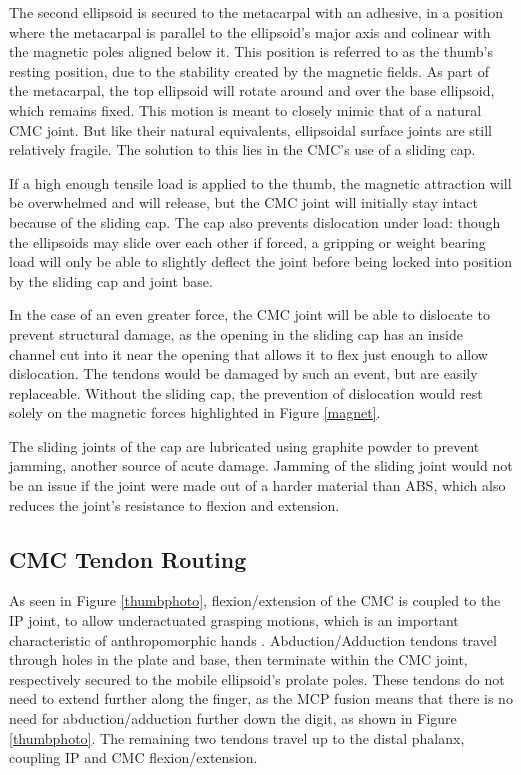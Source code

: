\documentclass[letterpaper, 10 pt, conference]{ieeeconf}  %
\newcommand{\rFig}[1]{Figure \ref{#1}}
\begin{document}
The second ellipsoid is secured to the metacarpal with an adhesive, in a position where the metacarpal is parallel to the ellipsoid's major axis and colinear with the magnetic poles aligned below it. This position is referred to as the thumb's resting position, due to the stability created by the magnetic fields. As part of the metacarpal, the top ellipsoid will rotate around and over the base ellipsoid, which remains fixed. This motion is meant to closely mimic that of a natural CMC joint. But like their natural equivalents, ellipsoidal surface joints are still relatively fragile. The solution to this lies in the CMC's use of a sliding cap.

If a high enough tensile load is applied to the thumb, the magnetic attraction will be overwhelmed and will release, but the CMC joint will initially stay intact because of the sliding cap. The cap also prevents dislocation under load: though the ellipsoids may slide over each other if forced, a gripping or weight bearing load will only be able to slightly deflect the joint before being locked into position by the sliding cap and joint base.

 In the case of an even greater force, the CMC joint will be able to dislocate to prevent structural damage, as the opening in the sliding cap has an inside channel cut into it near the opening that allows it to flex just enough to allow dislocation. The tendons would be damaged by such an event, but are easily replaceable. Without the sliding cap, the prevention of dislocation would rest solely on the magnetic forces highlighted in \rFig{magnet}.
 
  The sliding joints of the cap are lubricated using graphite powder to prevent jamming, another source of acute damage. Jamming of the sliding joint would not be an issue if the joint were made out of a harder material than ABS, which also reduces the joint's resistance to flexion and extension.

\subsection{CMC Tendon Routing}

As seen in \rFig{thumbphoto}, flexion/extension of the CMC is coupled to the IP joint, to allow underactuated grasping motions, which is an important characteristic of anthropomorphic hands \cite{Martell}. Abduction/Adduction tendons travel through holes in the plate and base, then terminate within the CMC joint, respectively secured to the mobile ellipsoid's prolate poles. These tendons do not need to extend further along the finger, as the MCP fusion means that there is no need for abduction/adduction further down the digit, as shown in \rFig{thumbphoto}. The remaining two tendons travel up to the distal phalanx, coupling IP and CMC flexion/extension.
\end{document}
